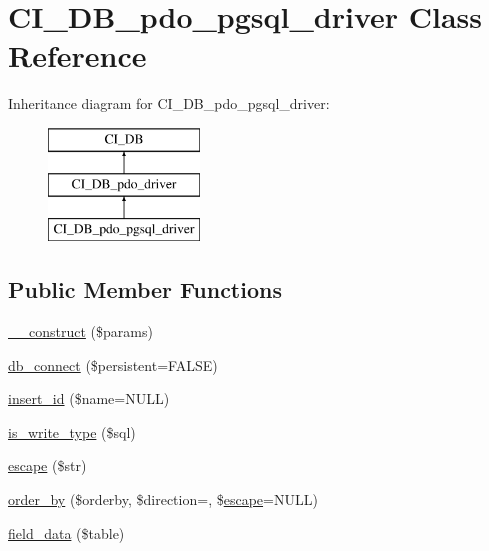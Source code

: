 \hypertarget{class_c_i___d_b__pdo__pgsql__driver}{}\section{C\+I\+\_\+\+D\+B\+\_\+pdo\+\_\+pgsql\+\_\+driver Class Reference}
\label{class_c_i___d_b__pdo__pgsql__driver}
Inheritance diagram for C\+I\+\_\+\+D\+B\+\_\+pdo\+\_\+pgsql\+\_\+driver\+:\begin{figure}[H]
\begin{center}
\leavevmode
\includegraphics[height=3.000000cm]{class_c_i___d_b__pdo__pgsql__driver}
\end{center}
\end{figure}
\subsection*{Public Member Functions}
\begin{DoxyCompactItemize}
\item 
\mbox{\hyperlink{class_c_i___d_b__pdo__pgsql__driver_a9162320adff1a1a4afd7f2372f753a3e}{\+\_\+\+\_\+construct}} (\$params)
\item 
\mbox{\hyperlink{class_c_i___d_b__pdo__pgsql__driver_a52bf595e79e96cc0a7c907a9b45aeb4d}{db\+\_\+connect}} (\$persistent=F\+A\+L\+SE)
\item 
\mbox{\hyperlink{class_c_i___d_b__pdo__pgsql__driver_ae61dc2c85e5516f143f6246c686bc3fc}{insert\+\_\+id}} (\$name=N\+U\+LL)
\item 
\mbox{\hyperlink{class_c_i___d_b__pdo__pgsql__driver_af435df5703c238769d6d16fde6d51182}{is\+\_\+write\+\_\+type}} (\$sql)
\item 
\mbox{\hyperlink{class_c_i___d_b__pdo__pgsql__driver_ac8f37ca5703d4558c732e692194f8cd6}{escape}} (\$str)
\item 
\mbox{\hyperlink{class_c_i___d_b__pdo__pgsql__driver_a6d1ce6a3b22187165ce7d710ce91841d}{order\+\_\+by}} (\$orderby, \$direction=\textquotesingle{}\textquotesingle{}, \$\mbox{\hyperlink{class_c_i___d_b__pdo__pgsql__driver_ac8f37ca5703d4558c732e692194f8cd6}{escape}}=N\+U\+LL)
\item 
\mbox{\hyperlink{class_c_i___d_b__pdo__pgsql__driver_a90355121e1ed009e0efdbd544ab56efa}{field\+\_\+data}} (\$table)
\end{DoxyCompactItemize}
